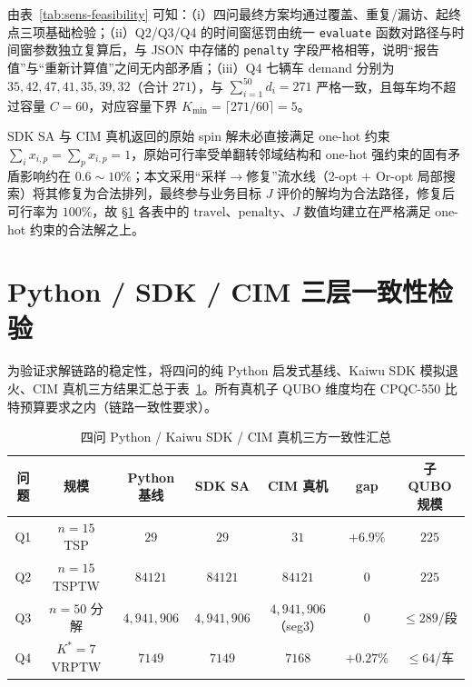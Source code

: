 \documentclass[UTF8,12pt,a4paper]{ctexart}
\begin{document}
由表~\ref{tab:sens-feasibility} 可知：（i）四问最终方案均通过覆盖、重复/漏访、起终点三项基础检验；（ii）Q2/Q3/Q4 的时间窗惩罚由统一 \texttt{evaluate} 函数对路径与时间窗参数独立复算后，与 JSON 中存储的 \texttt{penalty} 字段严格相等，说明``报告值''与``重新计算值''之间无内部矛盾；（iii）Q4 七辆车 demand 分别为 $35,42,47,41,35,39,32$（合计 $271$），与 $\sum_{i=1}^{50}d_i\!=\!271$ 严格一致，且每车均不超过容量 $C\!=\!60$，对应容量下界 $K_{\min}\!=\!\lceil 271/60\rceil\!=\!5$。

SDK SA 与 CIM 真机返回的原始 spin 解未必直接满足 one-hot 约束 $\sum_i x_{i,p}\!=\!\sum_p x_{i,p}\!=\!1$，原始可行率受单翻转邻域结构和 one-hot 强约束的固有矛盾影响约在 $0.6\!\sim\!10\%$；本文采用``采样$\to$修复''流水线（2-opt $+$ Or-opt 局部搜索）将其修复为合法排列，最终参与业务目标 $J$ 评价的解均为合法路径，修复后可行率为 $100\%$，故 §\ref{sec:sens-cross} 各表中的 $\mathrm{travel}$、$\mathrm{penalty}$、$J$ 数值均建立在严格满足 one-hot 约束的合法解之上。

\section{Python / SDK / CIM 三层一致性检验}
\label{sec:sens-cross}

为验证求解链路的稳定性，将四问的纯 Python 启发式基线、Kaiwu SDK 模拟退火、CIM 真机三方结果汇总于表~\ref{tab:sens-cross}。所有真机子 QUBO 维度均在 CPQC-550 比特预算要求之内（链路一致性要求）。

\begin{table}[H]
    \centering
    \caption{四问 Python / Kaiwu SDK / CIM 真机三方一致性汇总}
    \label{tab:sens-cross}
    \footnotesize
    \begin{tabular}{ccccccc}
        \toprule
        问题 & 规模 & Python 基线 & SDK SA & CIM 真机 & gap & 子 QUBO 规模 \\
        \midrule
        Q1 & $n\!=\!15$ TSP    & $29$         & $29$         & $31$           & $+6.9\%$  & $225$ \\
        Q2 & $n\!=\!15$ TSPTW  & $84121$      & $84121$      & $84121$        & $0$       & $225$ \\
        Q3 & $n\!=\!50$ 分解   & $4{,}941{,}906$ & $4{,}941{,}906$ & $4{,}941{,}906$（seg3）& $0$ & $\le 289$/段 \\
        Q4 & $K^*\!=\!7$ VRPTW & $7149$       & $7149$       & $7168$         & $+0.27\%$ & $\le 64$/车 \\
        \bottomrule
    \end{tabular}
\end{table}
\end{document}
